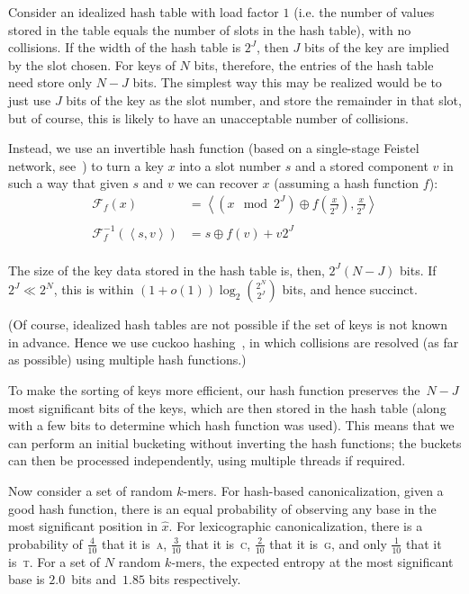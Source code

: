 \documentclass{bioinfo}
\newcommand{\kmers}{$k$-mers{}}
\newcommand{\dna}[1]{\textsc{#1}}
\begin{document}
Consider an idealized hash table with load factor $1$ (i.e. the number
of values stored in the table equals the number of slots in the hash
table), with no collisions.
If the width of the hash table is $2^J$, then $J$ bits of
the key are implied by the slot chosen. For keys of $N$ bits, therefore,
the entries of the hash table need store only $N - J$ bits. The simplest
way this may be realized would be to just use $J$ bits of the key as
the slot number, and store the remainder in that slot, but of course,
this is likely to have an unacceptable number of collisions.

Instead, we use an invertible hash function (based on a single-stage
Feistel network, see~\citep{LubyRackoff88}) to turn a key $x$
into a slot number $s$ and
a stored component $v$ in such a way that given $s$ and $v$ we can
recover $x$ (assuming a hash function $f$):
$$
\begin{array}{ll}
    \mathcal{F}_f(x) & = \left\langle \left(x \mod 2^J\right) \oplus f(\frac{x}{2^J}), \frac{x}{2^J} \right\rangle \\
    \\
    \mathcal{F}^{-1}_{f}(\left\langle s, v \right\rangle) & = s \oplus f(v) + v2^J \\
\end{array}
$$

The size of the key data stored in the hash table is, then, $2^J (N-J)$ bits.
If $2^J \ll 2^N$, this is within
$\left(1 + o(1)\right) \log_2 {{2^N} \choose {2^J}}$ bits, and hence succinct.

(Of course, idealized hash tables are not possible if the set of
keys is not known in advance. Hence we use cuckoo hashing~\citep{Pagh04},
in which collisions are resolved (as far as possible) using multiple hash
functions.)

To make the sorting of keys more efficient, our hash function preserves
the~$N-J$ most significant bits of the keys, which are then stored
in the hash table (along with a few bits to determine which
hash function was used).
This means that we can perform an initial bucketing without inverting
the hash functions; the buckets can then be processed independently, using
multiple threads if required.

Now consider a set of random \kmers.
For hash-based canonicalization, given a good
hash function, there is an equal probability of observing any base
in the most significant position in $\hat{x}$. For lexicographic
canonicalization, there is a probability of $\frac{4}{10}$ that it is~\dna{a},
$\frac{3}{10}$ that it is~\dna{c}, $\frac{2}{10}$ that
it is~\dna{g}, and only $\frac{1}{10}$ that it is~\dna{t}. For a set
of $N$ random \kmers, the expected entropy at the most significant base
is $2.0$~bits and~$1.85$ bits respectively.
\end{document}
